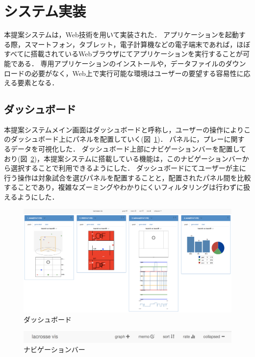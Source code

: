 \documentclass[sotsuron]{kuee}
\begin{document}
	\section{システム実装}
			本提案システムは，Web技術を用いて実装された．
			アプリケーションを起動する際，スマートフォン，タブレット，電子計算機などの電子端末であれば，ほぼすべてに搭載されているWebブラウザにてアプリケーションを実行することが可能である．
			専用アプリケーションのインストールや，データファイルのダウンロードの必要がなく，Web上で実行可能な環境はユーザーの要望する容易性に応える要素となる．
		\subsection{ダッシュボード}
			本提案システムメイン画面はダッシュボードと呼称し，ユーザーの操作によりこのダッシュボード上にパネルを配置していく(図~\ref{fig:dashboard})．
			パネルに，プレーに関するデータを可視化した．
			ダッシュボード上部にナビゲーションバーを配置しており(図~\ref{fig:nav})，本提案システムに搭載している機能は，このナビゲーションバーから選択することで利用できるようにした．
			ダッシュボードにてユーザーが主に行う操作は対象試合を選びパネルを配置することと，配置されたパネル間を比較することであり，複雑なズーミングやわかりにくいフィルタリングは行わずに扱えるようにした．
			\begin{figure}
				\begin{center}
					\includegraphics[width=\linewidth]{./png/dashboard.png}
				\end{center}
				\caption{ダッシュボード}
		  		\label{fig:dashboard}
			\end{figure}
			\begin{figure}
				\begin{center}
					\includegraphics[width=\linewidth]{./png/nav.png}
				\end{center}
				\caption{ナビゲーションバー}
		  		\label{fig:nav}
			\end{figure}
\end{document}
